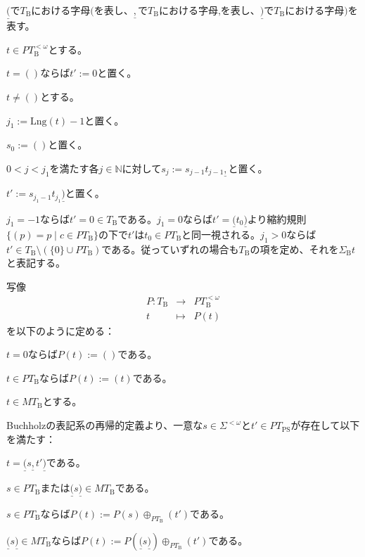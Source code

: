 \documentclass[dvipdfmx,uplatex]{jsarticle}
\theoremstyle{customnonumberbreakfortheorem}
\theoremstyle{customnonumberbreakforproof}
\begin{document}
\(\underline{(}\)で\(T_{\textrm{B}}\)における字母\(\textrm{(}\)を表し、\(\underline{,}\)で\(T_{\textrm{B}}\)における字母\(\textrm{,}\)を表し、\(\underline{)}\)で\(T_{\textrm{B}}\)における字母\(\textrm{)}\)を表す。

\(t \in PT_{\textrm{B}}^{< \omega}\)とする。
\begin{nenumerate}
	\item \(t = ()\)ならば\(t' := 0\)と置く。
	\item \(t \neq ()\)とする。
	\begin{nenumerate}
		\item \(j_1 := \textrm{Lng}(t)-1\)と置く。
		\item \(s_0 := ()\)と置く。
		\item \(0 < j < j_1\)を満たす各\(j \in \mathbb{N}\)に対して\(s_j := s_{j-1} t_{j-1} \underline{,}\)と置く。
		\item \(t' := s_{j_1-1} t_{j_1} \underline{)}\)と置く。
	\end{nenumerate}
	\item \(j_1 = -1\)ならば\(t' = 0 \in T_{\textrm{B}}\)である。\(j_1 = 0\)ならば\(t' = \underline{(} t_0 \underline{)}\)より縮約規則\(\{(p) = p \mid c \in PT_{\textrm{B}}\}\)の下で\(t'\)は\(t_0 \in PT_{\textrm{B}}\)と同一視される。\(j_1 > 0\)ならば\(t' \in T_{\textrm{B}} \setminus (\{0\} \cup PT_{\textrm{B}})\)である。従っていずれの場合も\(T_{\textrm{B}}\)の項を定め、それを\(\Sigma_{\textrm{B}} t\)と表記する。
\end{nenumerate}

写像
\begin{eqnarray*}
P \colon T_{\textrm{B}} & \to & PT_{\textrm{B}}^{< \omega} \\
t & \mapsto & P(t)
\end{eqnarray*}
を以下のように定める：
\begin{nenumerate}
	\item \(t = 0\)ならば\(P(t) := ()\)である。
	\item \(t \in PT_{\textrm{B}}\)ならば\(P(t) := (t)\)である。
	\item \(t \in MT_{\textrm{B}}\)とする。
	\begin{nenumerate}
		\item Buchholzの表記系の再帰的定義より、一意な\(s \in \Sigma^{<\omega}\)と\(t' \in PT_{\textrm{PS}}\)が存在して以下を満たす：
		\begin{nenumerate}
			\item \(t = \underline{(} s \underline{,} t' \underline{)}\)である。
			\item \(s \in PT_{\textrm{B}}\)または\(\underline{(} s \underline{)} \in MT_{\textrm{B}}\)である。
		\end{nenumerate}
		\item \(s \in PT_{\textrm{B}}\)ならば\(P(t) := P(s) \oplus_{PT_{\textrm{B}}} (t')\)である。
		\item \(\underline{(} s \underline{)} \in MT_{\textrm{B}}\)ならば\(P(t) := P(\underline{(} s \underline{)}) \oplus_{PT_{\textrm{B}}} (t')\)である。
	\end{nenumerate}
\end{nenumerate}
\end{document}
